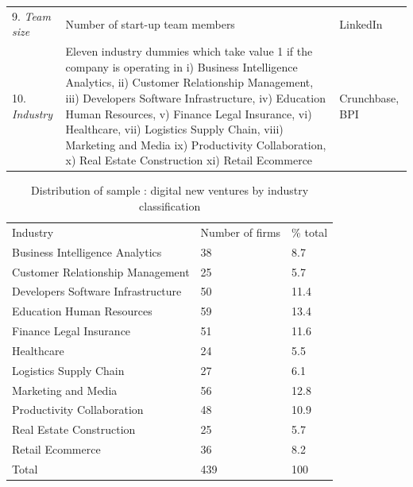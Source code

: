 \documentclass[12pt]{article}
\begin{document}
\begin{table} [ht]
\begin{tabularx}{\textwidth}{ p{5cm} p{7cm} p{2.2cm} }
9. \textit{Team size} & Number of start-up team members & LinkedIn \\
10. \textit{Industry} & Eleven industry dummies which take value 1 if the company is operating in i) Business Intelligence Analytics, ii) Customer Relationship Management, iii) Developers Software Infrastructure, iv) Education Human Resources, v) Finance Legal Insurance, vi) Healthcare, vii) Logistics Supply Chain, viii) Marketing and Media ix) Productivity Collaboration, x) Real Estate Construction xi) Retail Ecommerce & Crunchbase, BPI \\
\cmidrule(r){1-3}
\end{tabularx}
\label{table1}
\end{table}

\clearpage
\begin{table} [ht]
\caption{Distribution of sample : digital new ventures by industry classification}
\begin{spacing}{0.75}
\scriptsize
\renewcommand{\arraystretch}{1.5}
\begin{tabularx}{\textwidth}{ p{10cm} p{1.5cm} p{1.5cm} }
\toprule
\multicolumn{1}{l}{Industry}&\multicolumn{1}{l}{Number of firms}&\multicolumn{1}{l}{\% total}\\
\cmidrule(r){2-3}
Business Intelligence Analytics & 38 & 8.7 \\
Customer Relationship Management & 25 & 5.7 \\
Developers Software Infrastructure & 50 & 11.4 \\
Education Human Resources & 59 & 13.4 \\
Finance Legal Insurance & 51 & 11.6 \\
Healthcare & 24 & 5.5 \\
Logistics Supply Chain & 27 & 6.1 \\
Marketing and Media & 56 & 12.8 \\
Productivity Collaboration & 48 & 10.9 \\
Real Estate Construction & 25 & 5.7 \\
Retail Ecommerce & 36 & 8.2 \\
\cmidrule(r){2-3}
Total & 439 & 100 \\
\midrule
\end{tabularx}
\label{table2}
\end{spacing}
\end{table}
\end{document}
